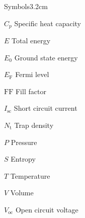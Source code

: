 \begin{mclistof}{Symbols}{3.2cm}
\vspace{\frontmatterbaselineskip}

\item[$C_p$] Specific heat capacity
\item[$E$] Total energy
\item[$E_0$] Ground state energy
\item[$E_\mathrm{F}$] Fermi level
\item[$\mathrm{FF}$] Fill factor
\item[$I_\mathrm{sc}$] Short circuit current
\item[$N_\mathrm{t}$] Trap density
\item[$P$] Pressure
\item[$S$] Entropy
\item[$T$] Temperature
\item[$V$] Volume
\item[$V_\mathrm{oc}$] Open circuit voltage


\end{mclistof} 
